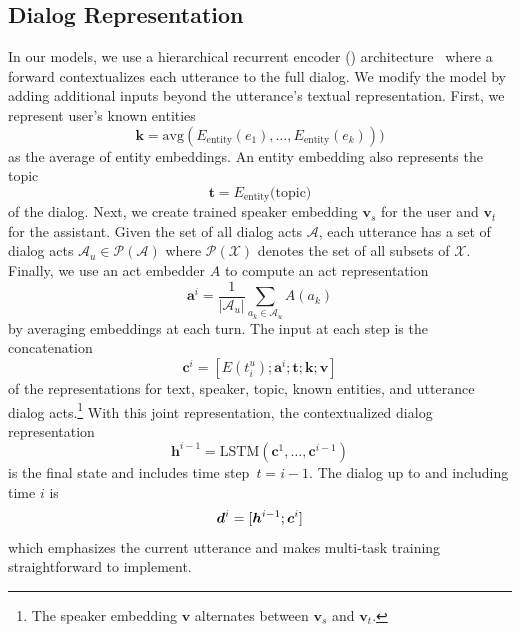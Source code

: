 \subsection{Dialog Representation}
\label{subsec:method:dialog}
In our models, we use a hierarchical recurrent encoder (\hre{}) architecture~\citep{Sordoni2015AHR,Serban2015BuildingED} where a forward  contextualizes each utterance to the full dialog.
We modify the  model by adding additional inputs beyond the utterance's textual representation.
First, we represent user's known entities
\begin{equation}
    \bm{k}=\text{avg}(E_{\text{entity}}(e_1),\ldots,E_{\text{entity}}(e_k)))
\end{equation}
as the average of entity embeddings.
An entity embedding also represents the topic
\begin{equation}
    \bm{t}=E_{\text{entity}}(\text{topic)}
\end{equation}
of the dialog.
Next, we create trained speaker embedding $\bm{v}_s$ for the user and $\bm{v}_t$ for the assistant.
Given the set of all dialog acts $\mathcal{A}$, each utterance has a set of dialog acts $\mathcal{A}_u\in\mathcal{P}(\mathcal{A})$ where $\mathcal{P(X)}$ denotes the set of all subsets of $\mathcal{X}$.
Finally, we use an act embedder $A$ to compute an act representation
\begin{equation}
    \bm{a}^i=\frac{1}{|\mathcal{A}_u|}\sum_{a_k\in\mathcal{A}_u} A(a_k)
\end{equation}
by averaging embeddings at each turn.
The input at each step is the concatenation
\begin{equation}
    \bm{c}^i=[E(t_i^u);\bm{a}^i;\bm{t};\bm{k};\bm{v}]
\end{equation}
of the representations for text, speaker, topic, known entities, and utterance dialog acts.\footnote{
    The speaker embedding $\bm{v}$ alternates between $\bm{v}_s$ and $\bm{v}_t$.
}
With this joint representation, the contextualized dialog representation
\begin{equation}
    \bm{h}^{i-1}=\text{LSTM}(\bm{c}^1,\ldots,\bm{c}^{i-1})
\end{equation}
is the final  state and includes time step~$t=i-1$.
The dialog up to and including time $i$ is
\begin{equation}
    \bm{d}^i=[\bm{h^}{i-1};\bm{c}^{i}]
\end{equation}
which emphasizes the current utterance and makes multi-task training straightforward to implement.

